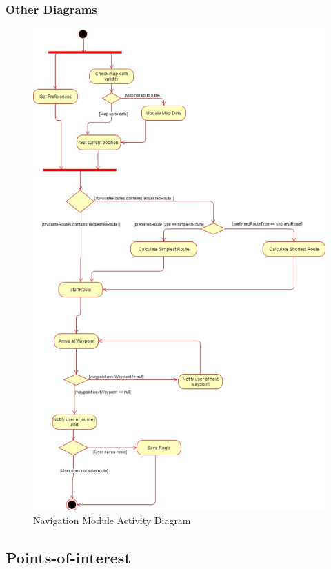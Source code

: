 \documentclass{article}
\begin{document}
        \subsubsection{Other Diagrams}
        \begin{figure}[H]
        	\includegraphics[width=\textwidth]{Navigation_Activity_Diagram}
        	\caption{Navigation Module Activity Diagram}
        \end{figure}
    \subsection{Points-of-interest}
    
\end{document}
